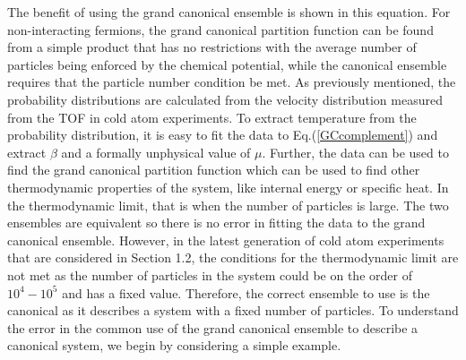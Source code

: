 The benefit of using the grand canonical ensemble is shown in this equation. 
For non-interacting fermions, the grand canonical partition function can be found from a simple product that has no restrictions with the average number of particles being enforced by the chemical potential, while the canonical ensemble requires that the particle number condition be met. 
As previously mentioned, the probability distributions are calculated from the velocity distribution measured from the TOF in cold atom experiments. To extract temperature from the probability distribution, it is easy to fit the data to Eq.\@ (\ref{GCcomplement}) and extract $\beta$ and a formally unphysical value of $\mu$. Further, the data can be used to find the grand canonical partition function which can be used to find other thermodynamic properties of the system, like internal energy or specific heat. In the thermodynamic limit, that is when the number of particles is large. The two ensembles are equivalent so there is no error in fitting the data to the grand canonical ensemble. 
However, in the latest generation of cold atom experiments that are considered in Section 1.2, the conditions for the thermodynamic limit are not met as the number of particles in the system could be on the order of $10^{4}-10^{5}$ and has a fixed value. Therefore, the correct ensemble to use is the canonical as it describes a system with a fixed number of particles. To understand the error in the common use of the grand canonical ensemble to describe a canonical system, we begin by considering a simple example. 


